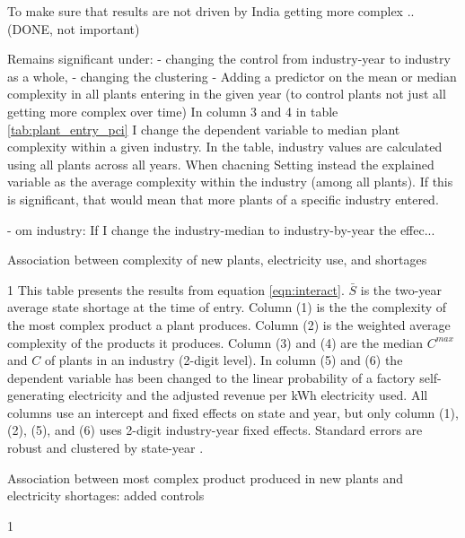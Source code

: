 \documentclass[11pt]{article}
\begin{document}
To make sure that results are not driven by India getting more complex .. (DONE, not important)

Remains significant under: 
 - changing the control from industry-year to industry as a whole,
 - changing the clustering
 - Adding a predictor on the mean or median complexity in all plants entering in the given year (to control plants not just all getting more complex over time)
In column 3 and 4 in table \ref{tab:plant_entry_pci} I change the dependent variable to median plant complexity within a given industry. In the table, industry values are calculated using all plants across all years. When chacning 
Setting instead the explained variable as the average complexity within the industry (among all plants). If this is significant, that would mean that more plants of a specific industry entered.

- om industry: If I change the industry-median to industry-by-year the effec...

\begin{table} 
	\begin{center}
		\begin{threeparttable}
			\caption{Association between complexity of new plants, electricity use, and shortages}
			\label{tab:entry_min}
			
			\begin{tablenotes} \footnotesize 
			\item[1] This table presents the results from equation \ref{eqn:interact}. $\bar{S}$ is the two-year average state shortage at the time of entry. Column (1) is the the complexity of the most complex product a plant produces. Column (2) is the weighted average complexity of the products it produces. Column (3) and (4) are the median $C^{max}$ and $C$ of plants in an industry (2-digit level). In column (5) and (6) the dependent variable has been changed to the linear probability of a factory self-generating electricity and the adjusted revenue per kWh electricity used. All columns use an intercept and fixed effects on state and year, but only column (1), (2), (5), and (6) uses 2-digit industry-year fixed effects. Standard errors are robust and clustered by state-year .
			\end{tablenotes}
		\end{threeparttable}
	\end{center}
\end{table}   


\begin{table} 
	\begin{center}
		\begin{threeparttable}
			\caption{Association between most complex product produced in new plants and electricity shortages: added controls}
			\label{tab:entry_max_max}
			
			\begin{tablenotes} \footnotesize 
			\item[1]
			\end{tablenotes}
		\end{threeparttable}
	\end{center}
\end{table}   
\end{document}
